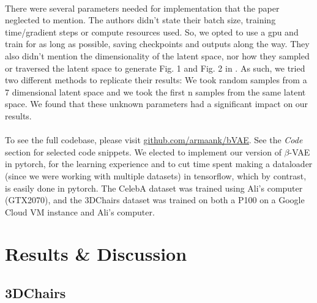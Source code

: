 \documentclass[justified,nobib]{tufte-handout}
\begin{document}
\begin{fullwidth}
\paragraph{} There were several parameters needed for implementation that the paper neglected to mention. The authors didn't state their batch size, training time/gradient steps or compute resources used. So, we opted to use a gpu and train for as long as possible, saving checkpoints and outputs along the way. They also didn't mention the dimensionality of the latent space, nor how they sampled or traversed the latent space to generate Fig. 1 and Fig. 2 in \citep{bvae}. As such, we tried two different methods to replicate their results: We took random samples from a 7 dimensional latent space and we took the first n samples from the same latent space. We found that these unknown parameters had a significant impact on our results. 


\paragraph{} To see the full codebase, please visit \underline{\href{https://github.com/armaank/bVAE}{github.com/armaank/bVAE}}. See the \textit{Code} section for selected code snippets. We elected to implement our version of $\beta$-VAE in pytorch, for the learning experience and to cut time spent making a dataloader (since we were working with multiple datasets) in tensorflow, which by contrast, is easily done in pytorch. The CelebA dataset was trained using Ali's computer (GTX2070), and the 3DChairs dataset was trained on both a P100 on a Google Cloud VM instance and Ali's computer. 
 
\clearpage
\section{Results \& Discussion}
\subsection{3DChairs}

\end{fullwidth}
\end{document}
